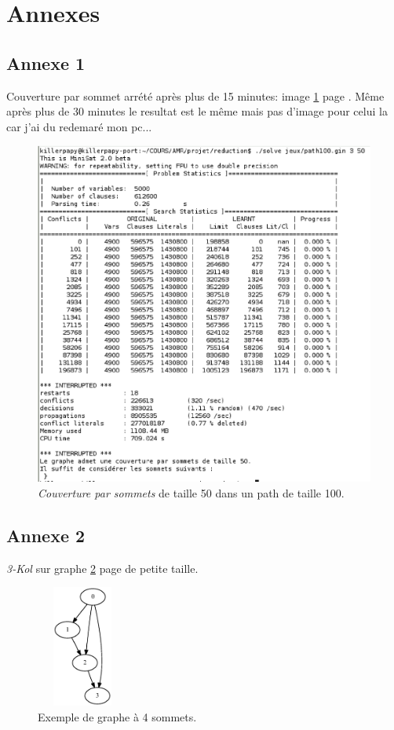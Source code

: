  \section{Annexes}
  \subsection{Annexe 1 \label{an1}}
 Couverture par sommet arrété après plus de 15 minutes: image \ref{lourd}
 page \pageref{lourd}. Même après plus de 30 minutes le resultat est le
 même mais pas d'image pour celui la car j'ai du redemaré mon pc...

  \begin{figure}[!ht]
   \begin{center}
    \includegraphics[width=12cm]{images/couv100.eps}
    \caption{\emph{Couverture par sommets} de taille 50 dans un path de
    taille 100.\label{lourd}}
   \end{center}
  \end{figure}

  \newpage

  \subsection{Annexe 2 \label{an2}}
  \emph{3-Kol} sur graphe \ref{graphe} page \pageref{graphe} de petite taille.
  \begin{figure}[!ht]
   \begin{center}
    \includegraphics[width=3cm,height=4cm]{images/jeurap.ps}
    \caption{Exemple de graphe à 4 sommets.\label{graphe}}
   \end{center}
  \end{figure}
  
